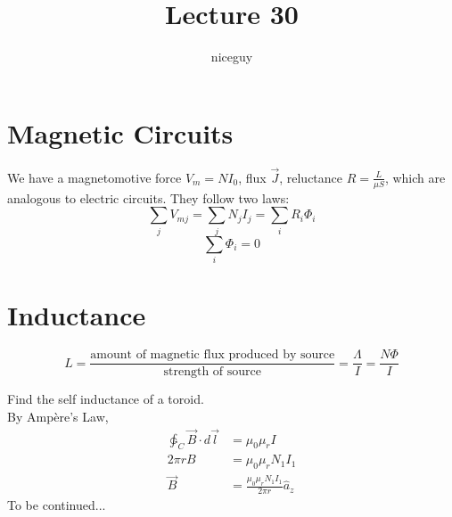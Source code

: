 \documentclass[12pt]{article}
\author{niceguy}
\title{Lecture 30}
\begin{document}
\maketitle

\section{Magnetic Circuits}

We have a magnetomotive force $V_m = NI_0$, flux $\vec J$, reluctance $R = \frac{L}{\mu S}$, which are analogous to electric circuits. They follow two laws:
$$\sum_j V_{mj} = \sum_j N_j I_j = \sum_i R_i\Phi_i$$
$$\sum_i \Phi_i = 0$$

\section{Inductance}

$$L = \frac{\text{amount of magnetic flux produced by source}}{\text{strength of source}} = \frac{\Lambda}{I} = \frac{N\Phi}{I}$$

\begin{ex}
    Find the self inductance of a toroid. \\
    By Amp\`ere's Law,
    \begin{align*}
        \ointctrclockwise_C \vec B \cdot d\vec l &= \mu_0\mu_r I \\
        2\pi r B &= \mu_0\mu_r N_1I_1 \\
        \vec B &= \frac{\mu_0\mu_r N_1I_1}{2\pi r} \hat a_z
    \end{align*}
    To be continued...
\end{ex}
\end{document}
